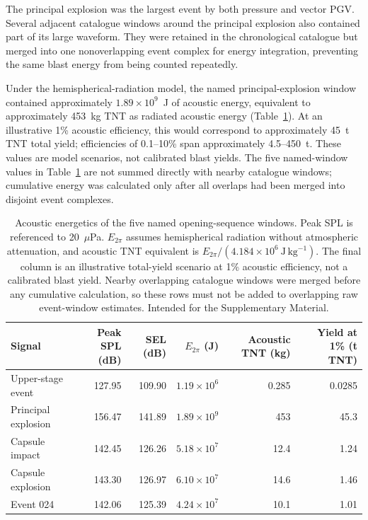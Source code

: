 \documentclass[]{seismica}
\begin{document}
The principal explosion was the largest event by both pressure and vector PGV.
Several adjacent catalogue windows around the principal explosion also
contained part of its large waveform. They were retained in the chronological
catalogue but merged into one nonoverlapping event complex for energy
integration, preventing the same blast energy from being counted repeatedly.

Under the hemispherical-radiation model, the named principal-explosion window
contained approximately $1.89\times10^9$~J of acoustic energy, equivalent to
approximately 453~kg TNT as radiated acoustic energy
(Table~\ref{tab:named_energetics}). At an illustrative 1\% acoustic efficiency,
this would correspond to approximately 45~t TNT total yield; efficiencies of
0.1--10\% span approximately 4.5--450~t. These values are model scenarios, not
calibrated blast yields. The five named-window values in
Table~\ref{tab:named_energetics} are not summed directly with nearby catalogue
windows; cumulative energy was calculated only after all overlaps had been
merged into disjoint event complexes.

\begin{table}[t]
\caption{Acoustic energetics of the five named opening-sequence windows.
Peak SPL is referenced to 20~$\mu$Pa. $E_{2\pi}$ assumes hemispherical
radiation without atmospheric attenuation, and acoustic TNT equivalent is
$E_{2\pi}/(4.184\times10^6~\mathrm{J\,kg^{-1}})$. The final column is an
illustrative total-yield scenario at 1\% acoustic efficiency, not a calibrated
blast yield. Nearby overlapping catalogue windows were merged before any
cumulative calculation, so these rows must not be added to overlapping raw
event-window estimates. Intended for the Supplementary Material.}
\label{tab:named_energetics}
\centering
\small
\begin{tabular}{lrrrrr}
\hline
Signal & Peak SPL (dB) & SEL (dB) & $E_{2\pi}$ (J) & Acoustic TNT (kg) & Yield at 1\% (t TNT) \\
\hline
Upper-stage event & 127.95 & 109.90 & $1.19\times10^6$ & 0.285 & 0.0285 \\
Principal explosion & 156.47 & 141.89 & $1.89\times10^9$ & 453 & 45.3 \\
Capsule impact & 142.45 & 126.26 & $5.18\times10^7$ & 12.4 & 1.24 \\
Capsule explosion & 143.30 & 126.97 & $6.10\times10^7$ & 14.6 & 1.46 \\
Event 024 & 142.06 & 125.39 & $4.24\times10^7$ & 10.1 & 1.01 \\
\hline
\end{tabular}
\end{table}
\end{document}
